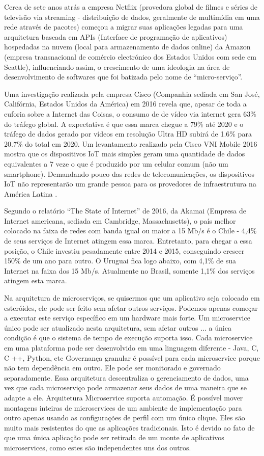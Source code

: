 \documentclass[journal]{IEEEtran}
\begin{document}
Cerca de sete anos atrás a empresa Netflix (provedora global de filmes e séries de televisão via streaming - distribuição de dados, geralmente de multimídia em uma rede através de pacotes) começou a migrar suas aplicações legadas para uma arquitetura baseada em APIs (Interface de programação de aplicativos) hospedadas na nuvem (local para armazenamento de dados online) da Amazon (empresa transnacional de comércio electrónico dos Estados Unidos com sede em Seattle), influenciando assim, o crescimento de uma ideologia na área de desenvolvimento de softwares que foi batizada pelo nome de “micro-serviço”.

Uma investigação realizada pela empresa Cisco (Companhia sediada em San José, Califórnia, Estados Unidos da América) em 2016 revela que, apesar de toda a euforia sobre a Internet das Coisas, o consumo de de vídeo via internet gera 63\% do tráfego global. A expectativa é que essa marca chegue a 79\% até 2020 e o tráfego de dados gerado por vídeos em resolução Ultra HD subirá de 1.6\% para 20.7\% do total em 2020. Um levantamento realizado pela Cisco VNI Mobile 2016 mostra que os dispositivos IoT mais simples geram uma quantidade de dados equivalentes a 7 veze o que é produzido por um celular comum (não um smartphone). Demandando pouco das redes de telecomunicações, os dispositivos IoT não representarão um grande pessoa para os provedores de infraestrutura na América Latina \cite{idc2017}. 

Segundo o relatório “The State of Internet” de 2016, da Akamai (Empresa de Internet americana, sediada em Cambridge, Massachusetts), o país melhor colocado na faixa de redes com banda igual ou maior a 15 Mb/s é o Chile - 4,4\% de seus serviços de Internet atingem essa marca. Entretanto, para chegar a essa posição, o Chile investiu pesadamente entre 2014 e 2015, conseguindo crescer 150\% de um ano para outro. O Uruguai fica logo abaixo, com 4,1\% de sua Internet na faixa dos 15 Mb/s. Atualmente no Brasil, somente 1,1\% dos serviços atingem esta marca.

Na arquitetura de microserviços, se quisermos que um aplicativo seja colocado em esteróides, ele pode ser feito sem afetar outros serviços. Podemos apenas começar a executar este serviço específico em um hardware mais forte. Um microservice único pode ser atualizado nesta arquitetura, sem afetar outros ... a única condição é que o sistema de tempo de execução suporta isso. Cada microservice em uma plataforma pode ser desenvolvido em uma linguagem diferente - Java, C, C ++, Python, etc Governança granular é possível para cada microservice porque não tem dependência em outro. Ele pode ser monitorado e governado separadamente. Essa arquitetura descentraliza o gerenciamento de dados, uma vez que cada microserviço pode armazenar seus dados de uma maneira que se adapte a ele. Arquitetura Microservice suporta automação. É possível mover montagens inteiras de microservices de um ambiente de implementação para outro apenas usando as configurações de perfil com um único clique. Eles são muito mais resistentes do que as aplicações tradicionais. Isto é devido ao fato de que uma única aplicação pode ser retirada de um monte de aplicativos microservices, como estes são independentes uns dos outros.
\end{document}
